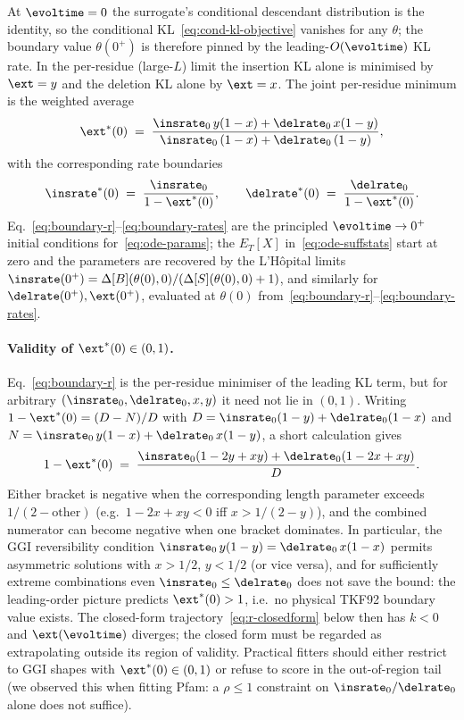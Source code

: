 At $\evoltime=0$ the surrogate's conditional descendant distribution is the
identity, so the conditional KL~\eqref{eq:cond-kl-objective} vanishes for any
$\theta$; the boundary value $\theta(0^+)$ is therefore pinned by the
leading-$O(\evoltime)$ KL rate.  In the per-residue (large-$L$) limit the
insertion KL alone is minimised by $\fragext=y$ and the deletion KL alone by
$\fragext=x$.  The joint per-residue minimum is the weighted average
\begin{equation}
\label{eq:boundary-r}
\fragext^\ast(0) \;=\; \frac{\insrate_0\,y(1-x) + \delrate_0\,x(1-y)}
{\insrate_0\,(1-x) + \delrate_0\,(1-y)},
\end{equation}
with the corresponding rate boundaries
\begin{equation}
\label{eq:boundary-rates}
\insrate^\ast(0) \;=\; \frac{\insrate_0}{1-\fragext^\ast(0)},
\qquad
\delrate^\ast(0) \;=\; \frac{\delrate_0}{1-\fragext^\ast(0)}.
\end{equation}
Eq.~\eqref{eq:boundary-r}--\eqref{eq:boundary-rates} are the principled
$\evoltime\to0^+$ initial conditions for~\eqref{eq:ode-params}; the
$E_T[X]$ in~\eqref{eq:ode-suffstats} start at zero and the parameters are
recovered by the L'H\^opital limits
$\insrate(0^+)=\Delta[B](\theta(0),0)/(\Delta[S](\theta(0),0)+1)$, and
similarly for $\delrate(0^+),\fragext(0^+)$, evaluated at $\theta(0)$
from~\eqref{eq:boundary-r}--\eqref{eq:boundary-rates}.

\paragraph{Validity of $\fragext^\ast(0) \in (0,1)$.}  Eq.~\eqref{eq:boundary-r}
is the per-residue minimiser of the leading KL term, but for arbitrary
$(\insrate_0,\delrate_0,x,y)$ it need not lie in $(0,1)$.  Writing
$1-\fragext^\ast(0) = (D-N)/D$ with $D=\insrate_0(1-y)+\delrate_0(1-x)$ and
$N=\insrate_0\,y(1-x)+\delrate_0\,x(1-y)$, a short calculation gives
\begin{equation}
\label{eq:rstar-validity}
1-\fragext^\ast(0)
\;=\; \frac{\insrate_0(1-2y+xy) + \delrate_0(1-2x+xy)}{D}.
\end{equation}
Either bracket is negative when the corresponding length parameter exceeds
$1/(2-\text{other})$ (e.g.\ $1-2x+xy<0$ iff $x>1/(2-y)$), and the
combined numerator can become negative when one bracket dominates.  In
particular, the GGI reversibility condition $\insrate_0\,y(1-y)=\delrate_0\,x(1-x)$
permits asymmetric solutions with $x>1/2$, $y<1/2$ (or vice versa), and
for sufficiently extreme combinations even $\insrate_0\le\delrate_0$ does
not save the bound: the leading-order picture predicts $\fragext^\ast(0)>1$,
i.e.\ no physical TKF92 boundary value exists.  The closed-form
trajectory~\eqref{eq:r-closedform} below then has $k<0$ and $\fragext(\evoltime)$
diverges; the closed form must be regarded as extrapolating outside its
region of validity.  Practical fitters should either restrict to GGI
shapes with $\fragext^\ast(0)\in(0,1)$ or refuse to score in the
out-of-region tail (we observed this when fitting Pfam: a $\rho\!\le\!1$
constraint on $\insrate_0/\delrate_0$ alone does not suffice).

